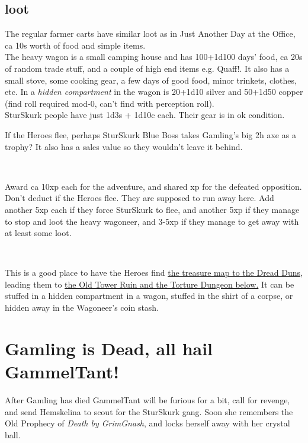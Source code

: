 \subsection*{loot}

The regular farmer carts have similar loot as in Just Another Day at the Office, ca 10s worth of food and simple items.\\
The heavy wagon is a small camping house and has 100+1d100 days' food, ca 20s of random trade stuff, and a couple of high end items e.g. Quaff!. It also has a small stove, some cooking gear, a few days of good food, minor trinkets, clothes, etc. In a \emph{hidden compartment} in the wagon is 20+1d10 silver and 50+1d50 copper (find roll required mod-0, can't find with perception roll).\\
SturSkurk people have just 1d3s + 1d10c each. Their gear is in ok condition.

If the Heroes flee, perhaps SturSkurk Blue Boss takes Gamling's big 2h axe as a trophy? It also has a sales value so they wouldn't leave it behind.

\

Award ca 10xp each for the adventure, and shared xp for the defeated opposition. Don't deduct if the Heroes flee. They are supposed to run away here. Add another 5xp each if they force SturSkurk to flee, and another 5xp if they manage to stop and loot the heavy wagoneer, and 3-5xp if they manage to get away with at least some loot.

\

This is a good place to have the Heroes find  
\hyperref[appendixtreasuremap]{the treasure map to the Dread Duns,} 
leading them to 
\hyperref[xxtorturedungeon]{the Old Tower Ruin and the Torture Dungeon below.} 
It can be stuffed in a hidden compartment in a wagon, stuffed in the shirt of a corpse, or hidden away in the Wagoneer's coin stash.





\vfill
{}
\section*{Gamling is Dead, all hail GammelTant!}

After Gamling has died GammelTant will be furious for a bit, call for revenge, and send Hemskelina to scout for the SturSkurk gang. Soon she remembers the Old Prophecy of \emph{Death by GrimGnash}, and locks herself away with her crystal ball.

